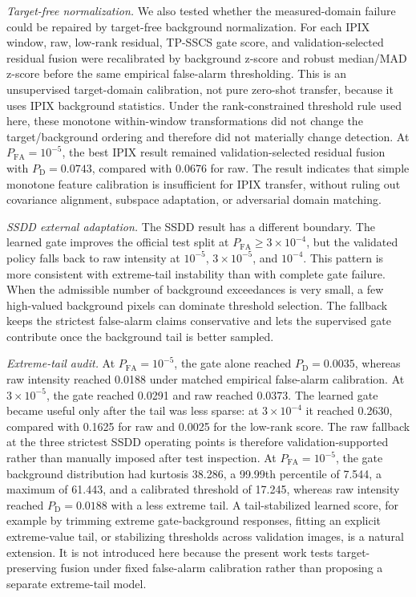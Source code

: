 \documentclass[journal]{IEEEtran}
\begin{document}
\noindent\textit{Target-free normalization.} We also tested whether the measured-domain failure could be repaired by target-free background normalization. For each IPIX window, raw, low-rank residual, TP-SSCS gate score, and validation-selected residual fusion were recalibrated by background z-score and robust median/MAD z-score before the same empirical false-alarm thresholding. This is an unsupervised target-domain calibration, not pure zero-shot transfer, because it uses IPIX background statistics. Under the rank-constrained threshold rule used here, these monotone within-window transformations did not change the target/background ordering and therefore did not materially change detection. At $P_{\mathrm{FA}}=10^{-5}$, the best IPIX result remained validation-selected residual fusion with $P_{\mathrm{D}}=0.0743$, compared with 0.0676 for raw. The result indicates that simple monotone feature calibration is insufficient for IPIX transfer, without ruling out covariance alignment, subspace adaptation, or adversarial domain matching.

\noindent\textit{SSDD external adaptation.} The SSDD result has a different boundary. The learned gate improves the official test split at $P_{\mathrm{FA}}\geq3\times10^{-4}$, but the validated policy falls back to raw intensity at $10^{-5}$, $3\times10^{-5}$, and $10^{-4}$. This pattern is more consistent with extreme-tail instability than with complete gate failure. When the admissible number of background exceedances is very small, a few high-valued background pixels can dominate threshold selection. The fallback keeps the strictest false-alarm claims conservative and lets the supervised gate contribute once the background tail is better sampled.

\noindent\textit{Extreme-tail audit.} At $P_{\mathrm{FA}}=10^{-5}$, the gate alone reached $P_{\mathrm{D}}=0.0035$, whereas raw intensity reached 0.0188 under matched empirical false-alarm calibration. At $3\times10^{-5}$, the gate reached 0.0291 and raw reached 0.0373. The learned gate became useful only after the tail was less sparse: at $3\times10^{-4}$ it reached 0.2630, compared with 0.1625 for raw and 0.0025 for the low-rank score. The raw fallback at the three strictest SSDD operating points is therefore validation-supported rather than manually imposed after test inspection. At $P_{\mathrm{FA}}=10^{-5}$, the gate background distribution had kurtosis 38.286, a 99.99th percentile of 7.544, a maximum of 61.443, and a calibrated threshold of 17.245, whereas raw intensity reached $P_{\mathrm{D}}=0.0188$ with a less extreme tail. A tail-stabilized learned score, for example by trimming extreme gate-background responses, fitting an explicit extreme-value tail, or stabilizing thresholds across validation images, is a natural extension. It is not introduced here because the present work tests target-preserving fusion under fixed false-alarm calibration rather than proposing a separate extreme-tail model.
\end{document}
